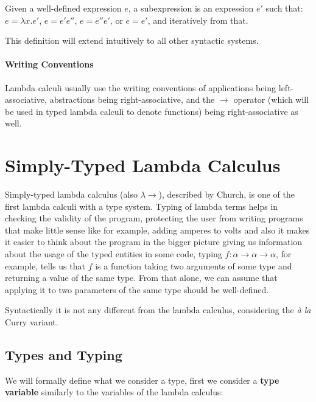 \begin{defn}[Subexpression]
Given a well-defined expression $e$, a subexpression is an expression $e'$ such that: $e = \lambda x . e'$, $e = e' e''$, $e = e'' e'$, or $e = e'$, and iteratively from that.
\end{defn}

This definition will extend intuitively to all other syntactic systems.

\paragraph{Writing Conventions}

Lambda calculi usually use the writing conventions of applications being left-associative, abstractions being right-associative, and the $\rightarrow$ operator (which will be used in typed lambda calculi to denote functions) being right-associative as well.

\section{Simply-Typed Lambda Calculus}

Simply-typed lambda calculus (also $\lambda\rightarrow$), described by Church, is one of the first lambda calculi with a type system. Typing of lambda terms helps in checking the validity of the program, protecting the user from writing programs that make little sense like for example, adding amperes to volts \cite{barendregt1992lambda} and also it makes it easier to think about the program in the bigger picture giving us information about the usage of the typed entities in some code, typing $f : \alpha \rightarrow \alpha \rightarrow \alpha$, for example, tells us that $f$ is a function taking two arguments of some type and returning a value of the same type. From that alone, we can assume that applying it to two parameters of the same type should be well-defined.

Syntactically it is not any different from the lambda calculus, considering the \emph{\`a la} Curry variant. \cite{barendregt1992lambda}

\subsection{Types and Typing}

We will formally define what we consider a type, first we consider a \textbf{type variable} similarly to the variables of the lambda calculus:

